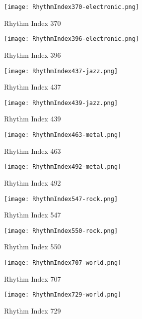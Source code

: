 \documentclass{article} %
\begin{document}
\begin{figure}[H]
\centering
\texttt{[image: RhythmIndex370-electronic.png]}
\caption{Rhythm Index 370}
\label{fig:rhy370_1}
\end{figure}

\begin{figure}[H]
\centering
\texttt{[image: RhythmIndex396-electronic.png]}
\caption{Rhythm Index 396}
\label{fig:rhy396_1}
\end{figure}

\begin{figure}[H]
\centering
\texttt{[image: RhythmIndex437-jazz.png]}
\caption{Rhythm Index 437}
\label{fig:rhy437_1}
\end{figure}

\begin{figure}[H]
\centering
\texttt{[image: RhythmIndex439-jazz.png]}
\caption{Rhythm Index 439}
\label{fig:rhy439_1}
\end{figure}

\begin{figure}[H]
\centering
\texttt{[image: RhythmIndex463-metal.png]}
\caption{Rhythm Index 463}
\label{fig:rhy463_1}
\end{figure}

\begin{figure}[H]
\centering
\texttt{[image: RhythmIndex492-metal.png]}
\caption{Rhythm Index 492}
\label{fig:rhy492_1}
\end{figure}

\begin{figure}[H]
\centering
\texttt{[image: RhythmIndex547-rock.png]}
\caption{Rhythm Index 547}
\label{fig:rhy547_1}
\end{figure}

\begin{figure}[H]
\centering
\texttt{[image: RhythmIndex550-rock.png]}
\caption{Rhythm Index 550}
\label{fig:rhy550_1}
\end{figure}

\begin{figure}[H]
\centering
\texttt{[image: RhythmIndex707-world.png]}
\caption{Rhythm Index 707}
\label{fig:rhy707_1}
\end{figure}

\begin{figure}[H]
\centering
\texttt{[image: RhythmIndex729-world.png]}
\caption{Rhythm Index 729}
\label{fig:rhy729_1}
\end{figure}
\clearpage
\end{document}
